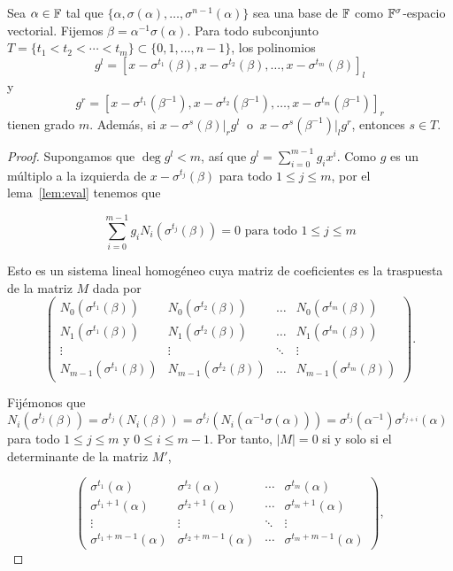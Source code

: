 \begin{lemma}
\label{lem:deg_lcm}
    Sea \(\alpha \in \mathbb{F}\) tal que \(\{\alpha, \sigma(\alpha), \dots, \sigma^{n-1}(\alpha)\}\) sea una base de \(\mathbb{F}\) como  \(\mathbb{F}^\sigma\)-espacio vectorial. Fijemos  \(\beta = \alpha^{-1}\sigma(\alpha)\). Para todo subconjunto \(T = \{t_1 < t_2 < \cdots < t_m\} \subset \{0, 1, \dots, n-1\}\), los polinomios
    \[
    g^l = [x - \sigma^{t_1}(\beta), x - \sigma^{t_2}(\beta), \dots, x - \sigma^{t_m}(\beta)]_l
    \]
y
    \[
    g^r = [x - \sigma^{t_1}(\beta^{-1}), x - \sigma^{t_2}(\beta^{-1}), \dots, x - \sigma^{t_m}(\beta^{-1})]_r
    \]
tienen grado \(m\). Además, si \(x - \sigma^s(\beta) |_r g^l\ \) o \(\ x - \sigma^s(\beta^{-1}) |_l g^r\), entonces \(s \in T\).
\end{lemma}

\begin{proof}
    Supongamos que \(\deg g^l < m\), así que \(g^l = \sum_{i=0}^{m-1} g_i x^i\). Como \(g\) es un múltiplo a la izquierda de \(x - \sigma^{t_j}(\beta)\) para todo \(1 \leq j \leq m\), por el lema~\ref{lem:eval} tenemos que

\begin{equation}
\label{linear_system_1}
    \sum_{i=0}^{m-1}g_i N_i(\sigma^{t_j}(\beta)) = 0 \text{ para todo } 1 \leq j \leq m
\end{equation}

Esto es un sistema lineal homogéneo cuya matriz de coeficientes es la traspuesta de la matriz \(M\) dada por
\[
\begin{pmatrix}
    N_0(\sigma^{t_1}(\beta)) & N_0(\sigma^{t_2}(\beta)) & \dots & N_0(\sigma^{t_m}(\beta)) \\
    N_1(\sigma^{t_1}(\beta)) & N_1(\sigma^{t_2}(\beta)) & \dots & N_1(\sigma^{t_m}(\beta)) \\
    \vdots & \vdots & \ddots & \vdots \\
    N_{m-1}(\sigma^{t_1}(\beta)) & N_{m-1}(\sigma^{t_2}(\beta)) & \dots & N_{m-1}(\sigma^{t_m}(\beta))
\end{pmatrix}
.\]

Fijémonos que \(N_i(\sigma^{t_j}(\beta)) = \sigma^{t_j}(N_i(\beta)) = \sigma^{t_j}(N_i(\alpha^{-1}\sigma(\alpha))) = \sigma^{t_j}(\alpha^{-1}) \sigma^{t_{j+i}}(\alpha)\) para todo \(1 \leq j \leq m\) y \(0 \leq i \leq m-1\). Por tanto,  \(|M| = 0\) si y solo si el determinante de la matriz \(M'\),

\[
\begin{pmatrix}
    \sigma^{t_1}(\alpha) & \sigma^{t_2}(\alpha) & \cdots & \sigma^{t_m}(\alpha) \\
    \sigma^{t_1+1}(\alpha) & \sigma^{t_2+1}(\alpha) & \cdots & \sigma^{t_m+1}(\alpha) \\
    \vdots & \vdots & \ddots & \vdots \\
    \sigma^{t_1 + m-1}(\alpha) & \sigma^{t_2+m-1}(\alpha) & \cdots & \sigma^{t_m+m-1}(\alpha)
\end{pmatrix}
,\]


\end{proof}
